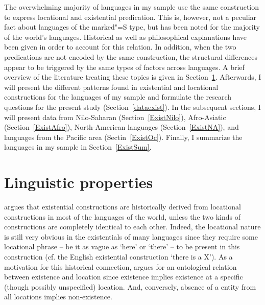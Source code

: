 The overwhelming majority of languages in my sample use the same construction to express locational and existential predication.
This is, however, not a peculiar fact about languages of the marked"=S type, but has been noted for the majority of the world's languages.
Historical as well as philosophical explanations have been given in order to account for this relation. %
In addition, when the two predications are not encoded by the same construction, the structural differences appear to be triggered by the same types of factors across languages. 
A brief overview of the literature treating these topics is given in Section~\ref{lingproploc}.
Afterwards, I will present the different patterns found in existential and locational constructions for the languages of my sample and formulate the research questions for the present study (Section~\ref{dataexist}). 
In the subsequent sections, I will present data from Nilo-Saharan (Section~\ref{ExistNilo}), Afro-Asiatic (Section~\ref{ExistAfro}), North-American languages (Section~\ref{ExistNA}), and languages from the Pacific area (Sectin~\ref{ExistOc}).
Finally, I summarize the languages in my sample in Section~\ref{ExistSum}.
 
\section{Linguistic properties}\label{lingproploc}


\citet{Lyons:1967,Lyons:1968} argues that existential constructions are historically derived from locational constructions in most of the languages of the world, unless the two kinds of constructions are completely identical to each other.
Indeed, the locational nature is still very obvious in the existentials of many languages since they require some locational phrase -- be it as vague as `here' or `there' -- to be present in this construction (cf. the English existential construction `there is a X').
As a motivation for this historical connection, \citet[499]{Lyons:1968} argues for an ontological relation between existence and location since existence implies existence at a specific (though possibly unspecified) location. And, conversely, absence of a entity from all locations implies non-existence. 

